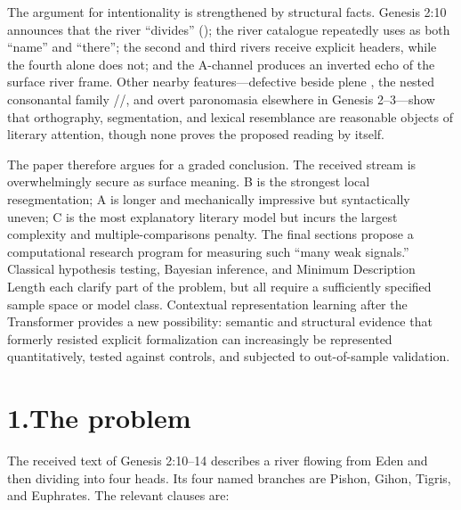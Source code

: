 The argument for intentionality is strengthened by structural facts.  Genesis 2:10 announces that the river ``divides'' (); the river catalogue repeatedly uses  as both ``name'' and ``there''; the second and third rivers receive explicit  headers, while the fourth alone does not; and the A-channel produces an inverted echo of the surface river frame.  Other nearby features---defective  beside plene , the nested consonantal family //, and overt paronomasia elsewhere in Genesis 2--3---show that orthography, segmentation, and lexical resemblance are reasonable objects of literary attention, though none proves the proposed reading by itself.

The paper therefore argues for a graded conclusion.  The received stream is overwhelmingly secure as surface meaning.  B is the strongest local resegmentation; A is longer and mechanically impressive but syntactically uneven; C is the most explanatory literary model but incurs the largest complexity and multiple-comparisons penalty.  The final sections propose a computational research program for measuring such ``many weak signals.''  Classical hypothesis testing, Bayesian inference, and Minimum Description Length each clarify part of the problem, but all require a sufficiently specified sample space or model class.  Contextual representation learning after the Transformer provides a new possibility: semantic and structural evidence that formerly resisted explicit formalization can increasingly be represented quantitatively, tested against controls, and subjected to out-of-sample validation.

\section*{1.\quad The problem}

The received text of Genesis 2:10--14 describes a river flowing from Eden and then dividing into four heads.  Its four named branches are Pishon, Gihon, Tigris, and Euphrates.  The relevant clauses are:

